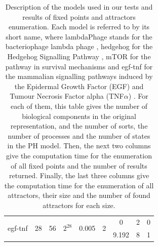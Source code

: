 \begin{changemargin}{-3cm}{-3cm}
\begin{center}
\begin{table}[ht]
\begin{center}
\begin{tabular}{| l || c | c | c || c | c || c | c | c |}
\hline
 \multirow{3}{*}{egf-tnf}  & \multirow{3}{*}{28} & \multirow{3}{*}{56} & \multirow{3}{*}{$2^{28}$} & \multirow{3}{*}{0.005} & \multirow{3}{*}{2} & 0 & 2 & 0\\
 & & & & & & 9.192 & 8 & 1\\
\hline
\end{tabular}
\vspace*{4pt}
\caption{\label{tab:models}%
Description of the models used in our tests and results of fixed points and attractors enumeration.
Each model is referred to by its short name, where
lambdaPhage stands for the bacteriophage lambda phage \cite{thieffry1995dynamical}, hedgehog for the Hedgehog Signalling Pathway \cite{stecca2010context}, mTOR for the pathway in survival mechanisms \cite{javle2010inhibition} and egf-tnf for the mammalian signalling pathways induced by the Epidermal Growth Factor (EGF) and Tumour Necrosis Factor alpha (TNF$\alpha$) \cite{chaouiya2013sbml}.
For each of them, this table gives the number of biological components
in the original representation,
and the number of sorts, the number of processes
and the number of states in the PH model.
Then, the next two columns give the computation time for the enumeration of all fixed points and the number of results returned. Finally, the last three columns give the computation time for the enumeration of all attractors, their size and the number of found attractors for each size.
}
\end{center}
\end{table}
\end{center}
\end{changemargin}

